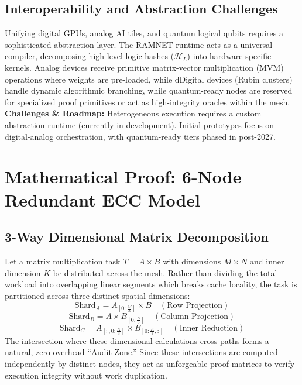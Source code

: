 \documentclass[conference]{IEEEtran}
\begin{document}
\subsection{Interoperability and Abstraction Challenges}
Unifying digital GPUs, analog AI tiles, and quantum logical qubits requires a sophisticated abstraction layer. The RAMNET runtime acts as a universal compiler, decomposing high-level logic hashes ($\mathcal{H}_L$) into hardware-specific kernels. Analog devices receive primitive matrix-vector multiplication (MVM) operations where weights are pre-loaded, while dDigital devices (Rubin clusters) handle dynamic algorithmic branching, while quantum-ready nodes are reserved for specialized proof primitives or act as high-integrity oracles within the mesh. \textbf{Challenges \& Roadmap:} Heterogeneous execution requires a custom abstraction runtime (currently in development). Initial prototypes focus on digital-analog orchestration, with quantum-ready tiers phased in post-2027.

\section{Mathematical Proof: 6-Node Redundant ECC Model}
\subsection{3-Way Dimensional Matrix Decomposition}
Let a matrix multiplication task $T = A \times B$ with dimensions $M \times N$ and inner dimension $K$ be distributed across the mesh. Rather than dividing the total workload into overlapping linear segments which breaks cache locality, the task is partitioned across three distinct spatial dimensions:
\begin{equation}
\text{Shard}_A = A_{\left[0:\frac{M}{3}\right]} \times B \quad (\text{Row Projection})
\end{equation}
\begin{equation}
\text{Shard}_B = A \times B_{\left[0:\frac{N}{3}\right]} \quad (\text{Column Projection})
\end{equation}
\begin{equation}
\text{Shard}_C = A_{\left[:, 0:\frac{K}{3}\right]} \times B_{\left[0:\frac{K}{3}, :\right]} \quad (\text{Inner Reduction})
\end{equation}
The intersection where these dimensional calculations cross paths forms a natural, zero-overhead ``Audit Zone.'' Since these intersections are computed independently by distinct nodes, they act as unforgeable proof matrices to verify execution integrity without work duplication.
\end{document}
